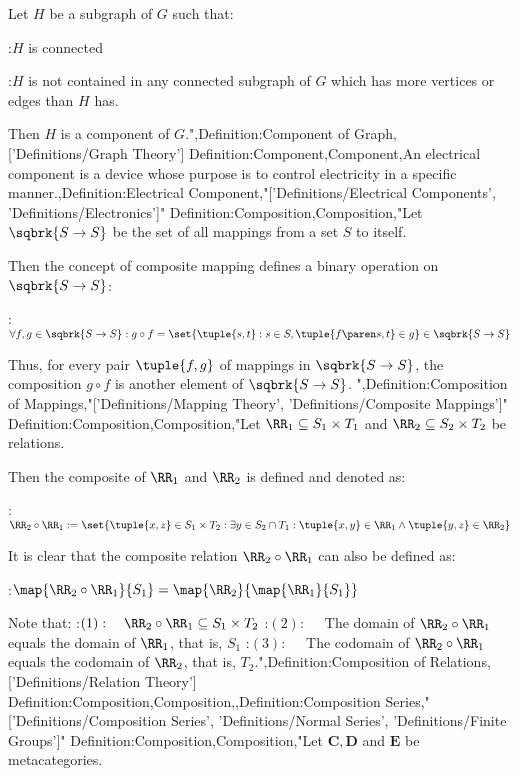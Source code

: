 Let $H$ be a subgraph of $G$ such that:

:$H$ is connected

:$H$ is not contained in any connected subgraph of $G$ which has more vertices or edges than $H$ has.


Then $H$ is a component of $G$.",Definition:Component of Graph,['Definitions/Graph Theory']
Definition:Component,Component,An electrical component is a device whose purpose is to control electricity in a specific manner.,Definition:Electrical Component,"['Definitions/Electrical Components', 'Definitions/Electronics']"
Definition:Composition,Composition,"Let $\sqbrk {S \to S}$ be the set of all mappings from a set $S$ to itself.

Then the concept of composite mapping defines a binary operation on $\sqbrk {S \to S}$:

:$\forall f, g \in \sqbrk {S \to S}: g \circ f = \set {\tuple {s, t}: s \in S, \tuple {f \paren s, t} \in g} \in \sqbrk {S \to S}$


Thus, for every pair $\tuple {f, g}$ of mappings in $\sqbrk {S \to S}$, the composition $g \circ f$ is another element of $\sqbrk {S \to S}$.
",Definition:Composition of Mappings,"['Definitions/Mapping Theory', 'Definitions/Composite Mappings']"
Definition:Composition,Composition,"Let $\RR_1 \subseteq S_1 \times T_1$ and $\RR_2 \subseteq S_2 \times T_2$ be relations.


Then the composite of $\RR_1$ and $\RR_2$ is defined and denoted as:

:$\RR_2 \circ \RR_1 := \set {\tuple {x, z} \in S_1 \times T_2: \exists y \in S_2 \cap T_1: \tuple {x, y} \in \RR_1 \land \tuple {y, z} \in \RR_2}$






It is clear that the composite relation $\RR_2 \circ \RR_1$ can also be defined as:

:$\map {\RR_2 \circ \RR_1} {S_1} = \map {\RR_2} {\map {\RR_1} {S_1} }$


Note that:
:$(1): \quad \RR_2 \circ \RR_1 \subseteq S_1 \times T_2$
:$(2): \quad$ The domain of $\RR_2 \circ \RR_1$ equals the domain of $\RR_1$, that is, $S_1$
:$(3): \quad$ The codomain of $\RR_2 \circ \RR_1$ equals the codomain of $\RR_2$, that is, $T_2$.",Definition:Composition of Relations,['Definitions/Relation Theory']
Definition:Composition,Composition,,Definition:Composition Series,"['Definitions/Composition Series', 'Definitions/Normal Series', 'Definitions/Finite Groups']"
Definition:Composition,Composition,"Let $\mathbf C, \mathbf D$ and $\mathbf E$ be metacategories.

